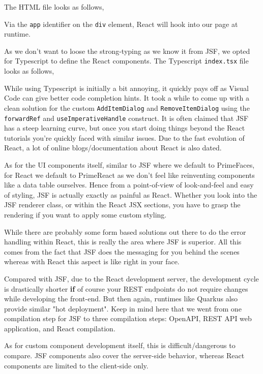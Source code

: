 The HTML file looks as follows,

Via the \texttt{app} identifier on the \texttt{div} element, React will hook into our page at runtime.

As we don't want to loose the strong-typing as we know it from JSF, we opted for Typescript to define the React components.
The Typescript \texttt{index.tsx} file looks as follows,

While using Typescript is initially a bit annoying, it quickly pays off as Visual Code can give better code completion hints.
It took a while to come up with a clean solution for the custom \texttt{AddItemDialog} and \texttt{RemoveItemDialog} using the \texttt{forwardRef} and \texttt{useImperativeHandle} construct.
It is often claimed that JSF has a steep learning curve, but once you start doing things beyond the React tutorials you're quickly faced with similar issues.
Due to the fast evolution of React, a lot of online blogs/documentation about React is also dated.

As for the UI components itself, similar to JSF where we default to PrimeFaces, for React we default to PrimeReact as we don't feel like reinventing components like a data table ourselves.
Hence from a point-of-view of look-and-feel and easy of styling, JSF is actually exactly as painful as React.
Whether you look into the JSF renderer class, or within the React JSX sections, you have to grasp the rendering if you want to apply some custom styling.

While there are probably some form based solutions out there to do the error handling within React, this is really the area where JSF is superior.
All this comes from the fact that JSF does the messaging for you behind the scenes whereas with React this aspect is like right in your face.

Compared with JSF, due to the React development server, the development cycle is drastically shorter \textbf{if} of course your REST endpoints do not require changes while developing the front-end.
But then again, runtimes like Quarkus also provide similar "hot deployment".
Keep in mind here that we went from one compilation step for JSF to three compilation steps: OpenAPI, REST API web application, and React compilation.

As for custom component development itself, this is difficult/dangerous to compare.
JSF components also cover the server-side behavior, whereas React components are limited to the client-side only.

